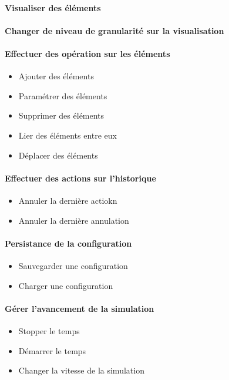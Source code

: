 {
	\paragraph{ Visualiser des éléments}
	\paragraph{ Changer de niveau de granularité sur la visualisation}
}
{
\paragraph{Effectuer des opération sur les éléments }
\begin{itemize}
	\item Ajouter des éléments
	\item Paramétrer des éléments
	\item Supprimer des éléments
	\item Lier des éléments entre eux
	\item Déplacer des éléments
\end{itemize}

\paragraph{Effectuer des actions sur l'historique}
\begin{itemize}
	\item Annuler la dernière actiokn
	\item Annuler la dernière annulation
\end{itemize}

\paragraph{Persistance de la configuration}
\begin{itemize}
	\item Sauvegarder une configuration
	\item Charger une configuration
\end{itemize}

\paragraph{Gérer l'avancement de la simulation}
\begin{itemize}
	\item Stopper le temps
	\item Démarrer le temps
	\item Changer la vitesse de la simulation
\end{itemize}

}
